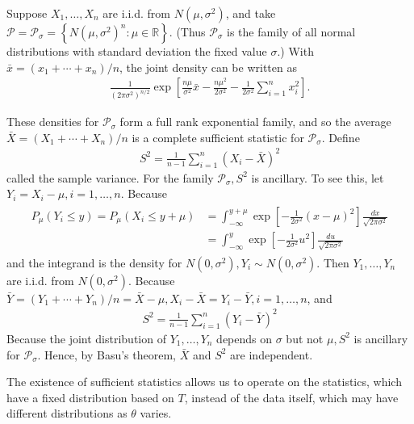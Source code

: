 \begin{eg}
    Suppose $X_1, \ldots, X_n$ are i.i.d. from $N\left(\mu, \sigma^2\right)$, and take $\mathcal{P}= \mathcal{P}_\sigma=\left\{N\left(\mu, \sigma^2\right)^n: \mu \in \mathbb{R}\right\}$. (Thus $\mathcal{P}_\sigma$ is the family of all normal distributions with standard deviation the fixed value $\sigma$.) With $\bar{x}=\left(x_1+\cdots+x_n\right) / n$, the joint density can be written as
\begin{align*}
\frac{1}{\left(2 \pi \sigma^2\right)^{n / 2}} \exp \left[\frac{n \mu}{\sigma^2} \bar{x}-\frac{n \mu^2}{2 \sigma^2}-\frac{1}{2 \sigma^2} \sum_{i=1}^n x_i^2\right] .
\end{align*}


These densities for $\mathcal{P}_\sigma$ form a full rank exponential family, and so the average $\bar{X}=\left(X_1+\cdots+X_n\right) / n$ is a complete sufficient statistic for $\mathcal{P}_\sigma$. Define
\begin{align*}
S^2=\frac{1}{n-1} \sum_{i=1}^n\left(X_i-\bar{X}\right)^2
\end{align*}
called the sample variance. For the family $\mathcal{P}_\sigma, S^2$ is ancillary. To see this, let $Y_i=X_i-\mu, i=1, \ldots, n$. Because
\begin{align*}
\begin{aligned}
P_\mu\left(Y_i \leq y\right)=P_\mu\left(X_i \leq y+\mu\right) & =\int_{-\infty}^{y+\mu} \exp \left[-\frac{1}{2 \sigma^2}(x-\mu)^2\right] \frac{d x}{\sqrt{2 \pi \sigma^2}} \\
& =\int_{-\infty}^y \exp \left[-\frac{1}{2 \sigma^2} u^2\right] \frac{d u}{\sqrt{2 \pi \sigma^2}}
\end{aligned}
\end{align*}
and the integrand is the density for $N\left(0, \sigma^2\right), Y_i \sim N\left(0, \sigma^2\right)$. Then $Y_1, \ldots, Y_n$ are i.i.d. from $N\left(0, \sigma^2\right)$. Because $\bar{Y}=\left(Y_1+\cdots+Y_n\right) / n=\bar{X}-\mu, X_i-\bar{X}= Y_i-\bar{Y}, i=1, \ldots, n$, and
\begin{align*}
S^2=\frac{1}{n-1} \sum_{i=1}^n\left(Y_i-\bar{Y}\right)^2
\end{align*}
Because the joint distribution of $Y_1, \ldots, Y_n$ depends on $\sigma$ but not $\mu, S^2$ is ancillary for $\mathcal{P}_\sigma$. Hence, by Basu's theorem, $\bar{X}$ and $S^2$ are independent.
\end{eg}




 The existence of sufficient statistics allows us to operate on the statistics, which have a fixed distribution based on $T$, instead of the data itself, which may have different distributions as $\theta$ varies.

